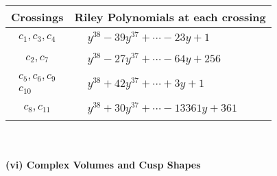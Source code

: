 \documentclass[1p]{elsarticle_modified}
\theoremstyle{definition}
\begin{document}
\begin{tabular}{m{50pt}|m{274pt}}
Crossings & \hspace{64pt}Riley Polynomials at each crossing \\
\hline $$\begin{aligned}c_{1},c_{3},c_{4}\end{aligned}$$&$\begin{aligned}
&y^{38}-39 y^{37}+\cdots-23 y+1
\end{aligned}$\\
\hline $$\begin{aligned}c_{2},c_{7}\end{aligned}$$&$\begin{aligned}
&y^{38}-27 y^{37}+\cdots-64 y+256
\end{aligned}$\\
\hline $$\begin{aligned}c_{5},c_{6},c_{9}\\c_{10}\end{aligned}$$&$\begin{aligned}
&y^{38}+42 y^{37}+\cdots+3 y+1
\end{aligned}$\\
\hline $$\begin{aligned}c_{8},c_{11}\end{aligned}$$&$\begin{aligned}
&y^{38}+30 y^{37}+\cdots-13361 y+361
\end{aligned}$\\
\hline
\end{tabular}\\~\\
\newpage\flushleft \textbf{(vi) Complex Volumes and Cusp Shapes}
\end{document}
